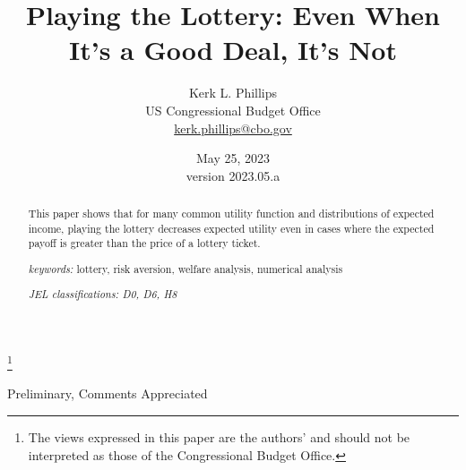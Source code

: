 \documentclass[letterpaper,12pt]{article}
\numberwithin{equation}{section}
\numberwithin{figure}{section}
\numberwithin{table}{section}
\begin{document}
\begin{titlepage}
	\title{Playing the Lottery: Even When It's a Good Deal, It's Not}
    
    \thanks{The views expressed in this paper are the authors' and should not be interpreted as those of the Congressional Budget Office.}

	\author{Kerk L. Phillips \\
	\small US Congressional Budget Office \\
	\small \href{mailto:kerk.phillips@cbo.gov}{kerk.phillips@cbo.gov} }


	\date{May 25, 2023\\
	\small{version 2023.05.a}}

	
	\maketitle

	\vspace{-0.3in}
	\begin{abstract}
	\small{
	This paper shows that for many common utility function and distributions of expected income, playing the lottery decreases expected utility even in cases where the expected payoff is greater than the price of a lottery ticket.

	\vspace{0.1in}

	\textit{keywords:} lottery, risk aversion, welfare analysis, numerical analysis

	\vspace{0.1in}

	\textit{JEL classifications: D0, D6, H8} }
	\end{abstract}

	\centering
	Preliminary, Comments Appreciated

	\thispagestyle{empty}
\end{titlepage}
\end{document}
